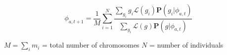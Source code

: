 \documentclass[11pt]{a0poster}
\begin{document}
{\begin{minipage}[t][2045pt][t]{\linewidth}
\begin{minipage}{0.6\linewidth}
\begin{minipage}{0.47\linewidth}
{\begin{minipage}[t][520pt][t]{\linewidth}
\large $$ \phi_{a,t+1} = \frac{1}{M}\sum_{i=1}^N \frac{\sum_{g_i} g_i  \mathcal{L}(g_i)\mathbf{P}(g_i | \phi_{a,t}) }{ \sum_{g_i} \mathcal{L}(g)\mathbf{P}(g | \phi_{a,t})} $$
\begin{center}
$M = \sum_i m_i$ = total number of chromosomes $N$ = number of individuals
\end{center}
\pagebreak
\end{minipage}
}
\end{minipage}

\pagebreak
\end{minipage}
\end{minipage}
}
\end{document}
